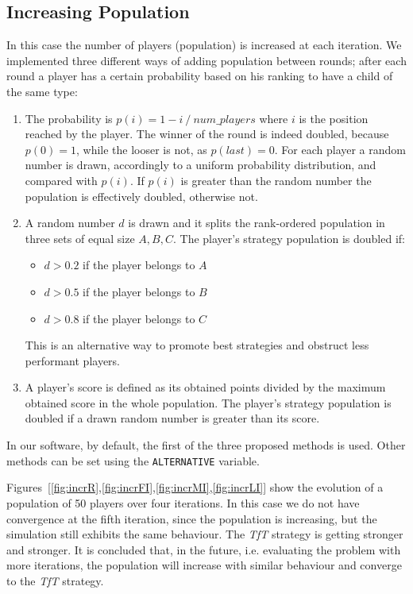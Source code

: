 \documentclass[journal,a4paper,10pt,twoside]{IEEEtran} %
\begin{document}
\subsection{Increasing Population}
In this case the number of players (population) is increased at each iteration. We implemented three different ways of adding population between rounds; after each round a player has a certain probability based on his ranking to have a child of the same type:
\begin{enumerate}
    \item The probability is $p(i)=1- i\ /\ num\_players$ where $i$ is the position reached by the player. The winner of the round is indeed doubled, because $p(0)=1$, while the looser is not, as $p(last)=0$.
    For each player a random number is drawn, accordingly to a uniform probability distribution, and compared with $p(i)$. If $p(i)$ is greater than the random number the population is effectively doubled, otherwise not.
    \item A random number $d$ is drawn and it splits the rank-ordered population in three sets of equal size $A,B,C$. The player's strategy population is doubled if:
    \begin{itemize}
        \item $d>0.2$ if the player belongs to $A$
        \item $d>0.5$ if the player belongs to $B$
        \item $d>0.8$ if the player belongs to $C$
    \end{itemize}
    This is an alternative way to promote best strategies and obstruct less performant players.
    \item A player's score is defined as its obtained points divided by the maximum obtained score in the whole population. The player's strategy population is doubled if a drawn random number is greater than its score.
\end{enumerate}

In our software, by default, the first of the three proposed methods is used. Other methods can be set using the \texttt{ALTERNATIVE} variable.

Figures~[\ref{fig:incrR},\ref{fig:incrFI},\ref{fig:incrMI},\ref{fig:incrLI}] show the evolution of a population of 50 players over four iterations. In this case we do not have convergence at the fifth iteration, since the population is increasing, but the simulation still exhibits the same behaviour. The \textit{TfT} strategy is getting stronger and stronger. It is concluded that, in the future, i.e. evaluating the problem with more iterations, the population will increase with similar behaviour and converge to the \textit{TfT} strategy.
\end{document}
